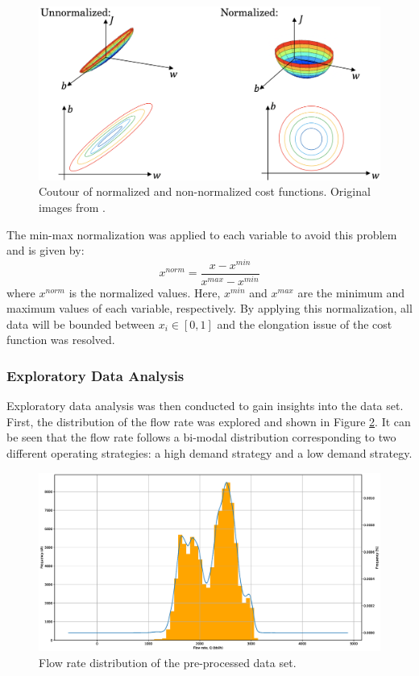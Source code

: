 \begin{figure}[h]
    \centering
    \includegraphics[width=.8\textwidth]{images/08featscale.png}
    \caption{Coutour of normalized and non-normalized cost functions. Original images from \cite{deeplearning_course}.}
    \label{fig:08featscale}
\end{figure}

The min-max normalization was applied to each variable to avoid this problem and is given by:
\begin{equation}
    x^{norm} = \frac{x - x^{min}}{x^{max} - x^{min}}
    \label{eq:08normalization}
\end{equation}
where $x^{norm}$ is the normalized values.  Here, $x^{min}$ and $x^{max}$ are the minimum and maximum values of each variable, respectively.  By applying this normalization, all data will be bounded between $x_i \in [0, 1]$ and the elongation issue of the cost function was resolved.

\subsubsection{Exploratory Data Analysis}
Exploratory data analysis was then conducted to gain insights into the data set.  First, the distribution of the flow rate was explored and shown in Figure \ref{fig:08flowrate_dist}.  It can be seen that the flow rate follows a bi-modal distribution corresponding to two different operating strategies: a high demand strategy and a low demand strategy.

\begin{figure}[h]
    \centering
    \includegraphics[scale=0.35]{images/08Flowrate_KDE.eps}
    \caption{Flow rate distribution of the pre-processed data set.}
    \label{fig:08flowrate_dist}
\end{figure}

